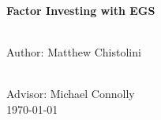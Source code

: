 \begin{titlepage}
\HRule \\[0.4cm]
{ \huge \bfseries Factor Investing with EGS}\\[0.4cm] %
\HRule \\[1.5cm]
 

\begin{minipage}{0.4\textwidth}
\begin{flushleft} \large
Author: \emph{}
Matthew Chistolini \textsc{}\\ %
\end{flushleft}

\end{minipage}\\[1cm]

 Advisor: \emph{}
Michael Connolly \textsc{}\\[2cm] %


{\large \today}\\[2cm] %

\vfill %

\end{titlepage}


